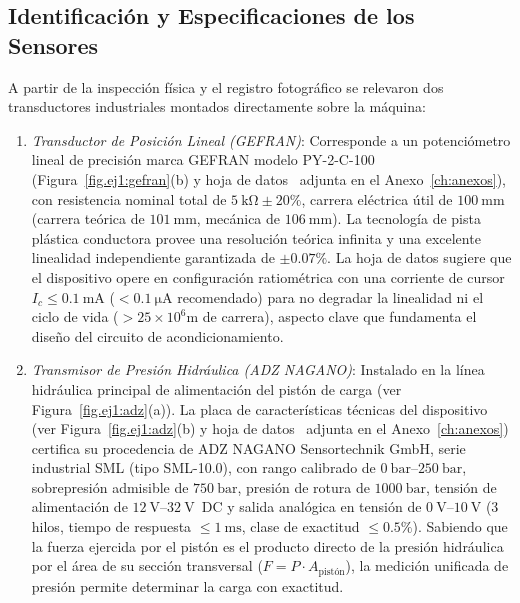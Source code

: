 \subsection{Identificación y Especificaciones de los Sensores}
A partir de la inspección física y el registro fotográfico se relevaron dos transductores industriales montados
directamente sobre la máquina:
\begin{enumerate}
    \item \emph{Transductor de Posición Lineal (GEFRAN)}: Corresponde a un potenciómetro
    lineal de precisión marca GEFRAN modelo PY-2-C-100 (Figura~\ref{fig.ej1:gefran}(b) y
    hoja de datos~\cite{gefran_py2} adjunta en el Anexo~\ref{ch:anexos}), con resistencia nominal total de
    $\qty{5}{\kilo\ohm}\pm 20\%$, carrera eléctrica útil de $\qty{100}{\milli\meter}$ (carrera teórica de $\qty{101}{\milli\meter}$,
    mecánica de $\qty{106}{\milli\meter}$). La tecnología de pista plástica
    conductora provee una resolución teórica infinita y una excelente linealidad independiente garantizada de
    $\pm 0.07\%$. La hoja de datos sugiere que el dispositivo opere en configuración
    ratiométrica con una corriente de cursor $I_c \le \qty{0.1}{\milli\ampere}$ ($< \qty{0.1}{\micro\ampere}$ recomendado)
    para no degradar la linealidad ni el ciclo de vida ($> 25 \times 10^6\unit{\meter}$ de carrera), aspecto clave que
    fundamenta el diseño del circuito de acondicionamiento.
    \item \emph{Transmisor de Presión Hidráulica (ADZ NAGANO)}: Instalado en la línea hidráulica principal de
    alimentación del pistón de carga (ver Figura~\ref{fig.ej1:adz}(a)). La placa de características
    técnicas del dispositivo (ver Figura~\ref{fig.ej1:adz}(b) y hoja de datos~\cite{adz_nagano} adjunta en el
    Anexo~\ref{ch:anexos}) certifica su procedencia de ADZ NAGANO Sensortechnik GmbH, serie industrial SML (tipo SML-10.0),
    con rango calibrado de $\qtyrange{0}{250}{\bar}$, sobrepresión admisible de $\qty{750}{\bar}$, presión de rotura de
    $\qty{1000}{\bar}$, tensión de alimentación de $\qtyrange{12}{32}{\volt}$~DC y salida analógica en tensión de
    $\qtyrange{0}{10}{\volt}$ (3 hilos, tiempo de respuesta $\le \qty{1}{\milli\second}$, clase de exactitud $\le 0.5\%$).
    Sabiendo que la fuerza ejercida por el pistón es el
    producto directo de la presión hidráulica por el área de su sección transversal ($F = P \cdot A_{\text{pistón}}$),
    la medición unificada de presión permite determinar la carga con exactitud.
\end{enumerate}

